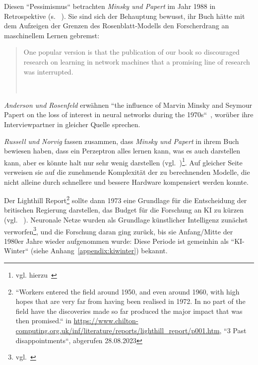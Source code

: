 \noindent
Diesen ``Pessimismus`` betrachten \textit{Minsky und Papert} im Jahr 1988 in Retrospektive (s. ~\cite[xiii]{MP88}). Sie sind sich der Behauptung bewusst, ihr Buch hätte mit dem Aufzeigen der Grenzen des Rosenblatt-Modells den Forscherdrang an maschinellem Lernen gebremst:

\blockquote[{~\cite[xii]{MP88}}]{
    One popular version is  that the publication of our book so discouraged research on learning in network machines that a promising line of research was interrupted.
}

\noindent
\textit{Anderson und Rosenfeld} erwähnen ``the influence of Marvin Minsky and Seymour Papert on the loss of interest in neural networks during the 1970s``~\cite[X]{AR98}, worüber ihre Interviewpartner in gleicher Quelle sprechen.

\textit{Russell und Norvig} fassen zusammen, dass \textit{Minsky und Papert} in ihrem Buch bewiesen haben, dass ein Perzeptron alles lernen kann, was es auch darstellen kann, aber es könnte halt nur sehr wenig darstellen (vgl.~\cite[45]{RN09})\footnote{
    vgl. hierzu~\cite[xiii]{MP88}
}. Auf gleicher Seite verweisen sie auf die zunehmende Komplexität der zu berechnenden Modelle, die nicht alleine durch schnellere und bessere Hardware kompensiert werden konnte.

Der Lighthill Report\footnote{
    ``Workers entered the field around 1950, and even around 1960, with high hopes that are very far from having been realised in 1972. In no part of the field have the discoveries made so far produced the major impact that was then promised.`` in \url{https://www.chilton-computing.org.uk/inf/literature/reports/lighthill\_report/p001.htm}, ``3 Past disappointments``, abgerufen 28.08.2023
} sollte dann 1973 eine Grundlage für die Entscheidung der britischen Regierung darstellen, das Budget für die Forschung an KI zu kürzen (vgl. ~\cite[45]{RN09}). Neuronale Netze wurden als Grundlage künstlicher Intelligenz zunächst verworfen\footnote{
    vgl.~\cite[641]{Ola96}
}, und die Forschung daran ging zurück, bis sie Anfang/Mitte der 1980er Jahre wieder aufgenommen wurde: Diese Periode ist gemeinhin als ``KI-Winter`` (siehe Anhang~\ref{appendix:kiwinter}) bekannt.





